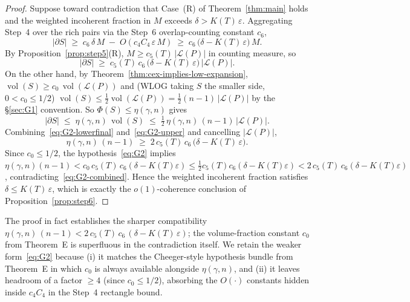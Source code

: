 \begin{proof}
Suppose toward contradiction that Case~(R) of
Theorem~\ref{thm:main} holds and the weighted incoherent fraction in
$M$ exceeds $\delta > K(T)\,\varepsilon$. Aggregating Step~4 over the
rich pairs via the Step~6 overlap-counting constant $c_6$,
\begin{equation}\label{eq:G2-lower}
  |\partial S|
  \;\ge\; c_6\,\delta\,M \;-\; O(c_4 C_4\,\varepsilon\, M)
  \;\ge\; c_6\,\big(\delta - K(T)\,\varepsilon\big)\,M.
\end{equation}
By Proposition~\ref{prop:step5}(R), $M \ge c_5(T)\,|\mathcal L(P)|$
in counting measure, so
\begin{equation}\label{eq:G2-lowerfinal}
  |\partial S| \;\ge\; c_5(T)\,c_6\,\big(\delta - K(T)\,\varepsilon\big)\,
  |\mathcal L(P)|.
\end{equation}
On the other hand, by Theorem~\ref{thm:cex-implies-low-expansion},
$\operatorname{vol}(S) \ge c_0\,\operatorname{vol}(\mathcal L(P))$ and
(WLOG taking $S$ the smaller side, $0 < c_0 \le 1/2$)
$\operatorname{vol}(S) \le \tfrac{1}{2}\operatorname{vol}(\mathcal
L(P)) = \tfrac{1}{2}(n-1)\,|\mathcal L(P)|$ by the
\S\ref{sec:G1} convention. So $\Phi(S) \le \eta(\gamma, n)$ gives
\begin{equation}\label{eq:G2-upper}
  |\partial S|
  \;\le\; \eta(\gamma, n)\,\operatorname{vol}(S)
  \;\le\; \tfrac{1}{2}\,\eta(\gamma, n)\,(n-1)\,|\mathcal L(P)|.
\end{equation}
Combining~\eqref{eq:G2-lowerfinal} and~\eqref{eq:G2-upper} and
cancelling $|\mathcal L(P)|$,
\begin{equation}\label{eq:G2-combined}
  \eta(\gamma, n)\,(n-1)
  \;\ge\; 2\,c_5(T)\,c_6\,\big(\delta - K(T)\,\varepsilon\big).
\end{equation}
Since $c_0 \le 1/2$, the hypothesis~\eqref{eq:G2} implies
$\eta(\gamma, n)(n-1) < c_0\,c_5(T)\,c_6(\delta - K(T)\varepsilon)
\le \tfrac{1}{2} c_5(T) c_6(\delta - K(T)\varepsilon) < 2\,c_5(T)\,c_6(\delta -
K(T)\varepsilon)$, contradicting~\eqref{eq:G2-combined}. Hence the
weighted incoherent fraction satisfies $\delta \le K(T)\,\varepsilon$,
which is exactly the $o(1)$-coherence conclusion of
Proposition~\ref{prop:step6}.
\end{proof}

\begin{remark}\label{rem:G2-sharp}
The proof in fact establishes the sharper compatibility
$\eta(\gamma, n)\,(n-1) < 2\,c_5(T)\,c_6\,(\delta - K(T)\,\varepsilon)$;
the volume-fraction constant $c_0$ from Theorem~E is superfluous in
the contradiction itself. We retain the weaker form~\eqref{eq:G2}
because (i) it matches the Cheeger-style hypothesis bundle from
Theorem~E in which $c_0$ is always available alongside $\eta(\gamma,
n)$, and (ii) it leaves headroom of a factor $\ge 4$ (since
$c_0 \le 1/2$), absorbing the $O(\cdot)$ constants hidden inside
$c_4 C_4$ in the Step~4 rectangle bound.
\end{remark}


